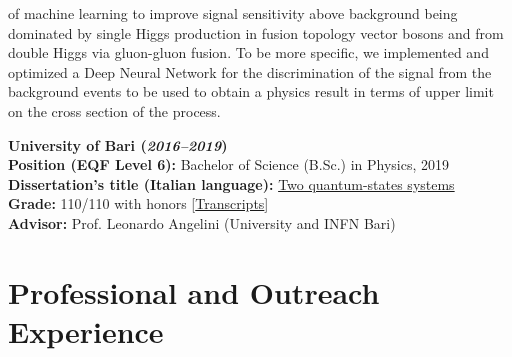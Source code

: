\documentclass[11pt]{res}
\newcommand{\MarginText}[1]{\section{#1}\vspace{10pt}}
\begin{document}
\begin{resume}
of machine learning to improve signal sensitivity above background being dominated by single Higgs production in fusion topology vector bosons and from double Higgs via gluon-gluon fusion. To be more specific, we implemented and optimized a Deep Neural Network for the discrimination of the signal from the background events to be used to obtain a physics result in terms of upper limit on the cross section of the process.

\textbf{University of Bari (\textit{2016--2019})}\\
\textbf{Position (EQF Level 6):} Bachelor of Science (B.Sc.) in Physics, 2019\\
\textbf{Dissertation's title (Italian language):} 
\href{https://drive.google.com/file/d/1fyNx6B4lviqkeJxsrIEsZ-UJhCTqDaSC/view?usp=share_link}{Two quantum-states systems}\\
\textbf{Grade:} 110/110 with honors [\href{https://drive.google.com/file/d/13qAI0iYuqlVBQinnvZXv1eGDBE0ShnbM/view?usp=sharing}{Transcripts}]\\
\textbf{Advisor:} Prof. Leonardo Angelini (University and INFN Bari)


\MarginText{Professional and Outreach Experience}


\end{resume}
\end{document}
